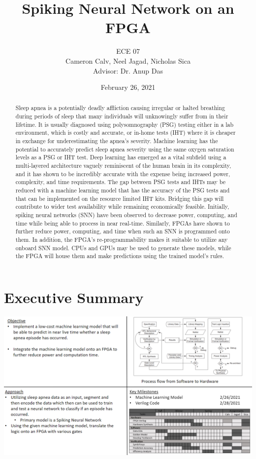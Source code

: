 \documentclass[12pt,titlepage]{article}
\title{Spiking Neural Network on an FPGA}
\author{ECE 07\\{\small{Cameron Calv, Neel Jagad, Nicholas Sica}}\\{\small{Advisor: Dr. Anup Das}}}
\date{February 26, 2021}
\begin{document}
\maketitle
\newpage
\clearpage
{}

\begin{abstract}
Sleep apnea is a potentially deadly affliction causing irregular or halted breathing during
	periods of sleep that many individuals will unknowingly suffer from in their lifetime. It 
	is usually diagnosed using polysomnography (PSG) testing either in a lab environment, which
	is costly and accurate, or in-home tests (IHT) where it is cheaper in exchange for underestimating
	the apnea’s severity. Machine learning has the potential to accurately predict sleep apnea severity
	using the same oxygen saturation levels as a PSG or IHT test. Deep learning has emerged as a vital
	subfield using a multi-layered architecture vaguely reminiscent of the human brain in its complexity,
	and it has shown to be incredibly accurate with the expense being increased power, complexity, and
	time requirements. The gap between PSG tests and IHTs may be reduced with a machine learning model
	that has the accuracy of the PSG tests and that can be implemented on the resource limited IHT kits.
	Bridging this gap will contribute to wider test availability while remaining economically feasible.
	Initially, spiking neural networks (SNN) have been observed to decrease power, computing, and time
	while being able to process in near real-time. Similarly, FPGAs have shown to further reduce power,
	computing, and time when such an SNN is programmed onto them. In addition, the FPGA’s re-programmability
	makes it suitable to utilize any onboard SNN model. CPUs and GPUs may be used to generate these models,
	while the FPGA will house them and make predictions using the trained model’s rules. 
\end{abstract}

\tableofcontents

\listoffigures

\listoftables

\newpage

\section{Executive Summary}
\begin{table}[!htb]
	\label{tbl:quadchart}
	\includegraphics[width=\linewidth]{quadchart.png}
\end{table}
\end{document}
